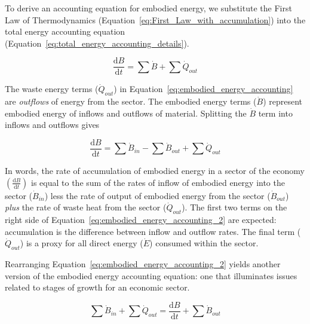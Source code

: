 To derive an accounting equation for embodied energy, we substitute the 
First Law of Thermodynamics
(Equation~\ref{eq:First_Law_with_accumulation})
into the total energy accounting equation (Equation~\ref{eq:total_energy_accounting_details}).

\begin{equation} \label{eq:embodied_energy_accounting}
	\frac{\mathrm{d}B}{\mathrm{d}t}
	= \sum \dot{B} 
	+ \sum \dot{Q}_{out}
\end{equation}

The waste energy terms ($\dot{Q}_{out}$) 
in Equation~\ref{eq:embodied_energy_accounting}
are \emph{outflows} of energy from the sector. 
The embodied energy 
terms ($\dot{B}$) represent embodied energy of inflows
and outflows of material. Splitting the $\dot{B}$ term
into inflows and outflows gives

\begin{equation} \label{eq:embodied_energy_accounting_2}
	\frac{\mathrm{d}B}{\mathrm{d}t}
	= \sum \dot{B}_{in}
	- \sum \dot{B}_{out} 
	+ \sum \dot{Q}_{out}
\end{equation}

In words, the rate of accumulation of embodied energy
in a sector of the economy 
$\left( \frac{\mathrm{d}B}{\mathrm{d}t} \right)$ 
is equal to the sum of the rates of 
inflow of embodied energy into the sector 
	($\dot{B}_{in}$) 
less the rate of output of embodied energy from the sector 
	($\dot{B}_{out}$) 
\emph{plus} the rate of waste heat from the sector 
	($\dot{Q}_{out}$). 
The first two terms on the right side of
Equation~\ref{eq:embodied_energy_accounting_2} are expected: 
accumulation is the difference between inflow and outflow rates. 
The final term ($\dot{Q}_{out}$) is a proxy 
for all direct energy ($\dot{E}$) consumed within the sector.

Rearranging Equation~\ref{eq:embodied_energy_accounting_2}
yields another version of the embodied energy accounting equation:
one that illuminates issues related to 
stages of growth for an economic sector.

\begin{equation} \label{eq:embodied_energy_accounting_3}
	\sum \dot{B}_{in}
	+ \sum \dot{Q}_{out}
	= \frac{\mathrm{d}B}{\mathrm{d}t} 
	+ \sum \dot{B}_{out}
\end{equation}


